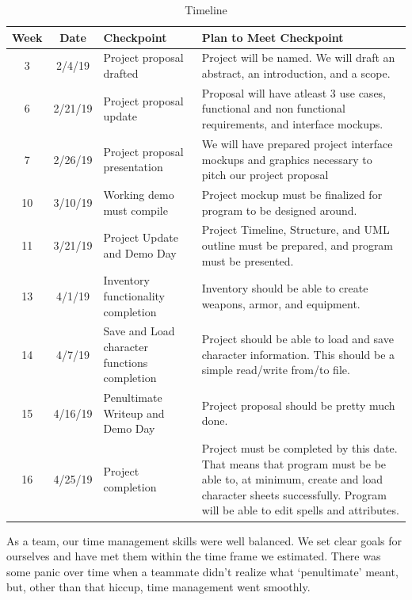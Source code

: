 \documentclass[10pt,conference,onecolumn,compsoc]{IEEEtran}
\begin{document}
\begin{table}[H]
\centering
\begin{tabular}{|c|c|p{1.5in}|p{2.7in}|}
\hline
Week & Date & Checkpoint & Plan to Meet Checkpoint \\
\hline \hline
3 & 2/4/19 & Project proposal drafted & Project will be named. We will draft an abstract, an introduction, and a scope.\\
\hline
6 & 2/21/19 & Project proposal update & Proposal will have atleast 3 use cases, functional and non functional requirements, and interface mockups.\\
\hline
7 & 2/26/19 & Project proposal presentation & We will have prepared project interface mockups and graphics necessary to pitch our project proposal \\
\hline
10 & 3/10/19 & Working demo must compile & Project mockup must be finalized for program to be designed around. \\
\hline
11 & 3/21/19 & Project Update and Demo Day & Project Timeline, Structure, and UML outline must be prepared, and program must be presented. \\
\hline
13 & 4/1/19 & Inventory functionality completion & Inventory should be able to create weapons, armor, and equipment. \\
\hline
14 & 4/7/19 & Save and Load character functions completion & Project should be able to load and save character information. This should be a simple read/write from/to file. \\ 
\hline
15 & 4/16/19 & Penultimate Writeup and Demo Day & Project proposal should be pretty much done. \\
\hline
16 & 4/25/19 & Project completion & Project must be completed by this date. That means that program must be be able to, at minimum, create and load character sheets successfully. Program will be able to edit spells and attributes.  \\

\hline
\end{tabular}
\caption{Timeline}
\label{tab:useCaseIndex}
\end{table}

As a team, our time management skills were well balanced. We set clear goals for ourselves and have met them within the time frame we estimated. There was some panic over time when a teammate didn't realize what `penultimate' meant, but, other than that hiccup, time management went smoothly. 
\end{document}
